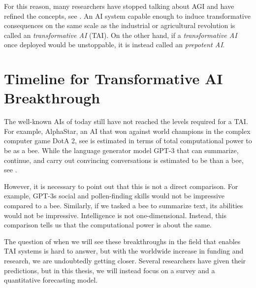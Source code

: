 \documentclass[12pt,A4]{report}
\theoremstyle{definition}
\begin{document}
For this reason, many researchers have stopped talking about AGI and have refined the concepts, see \citet{CritchKruger}. An AI system capable enough to induce transformative consequences on the same scale as the industrial or agricultural revolution is called an \textit{transformative AI} (TAI). On the other hand, if a \textit{transformative AI} once deployed would be unstoppable, it is instead called an \textit{prepotent AI}. 


\section{Timeline for Transformative AI Breakthrough}
The well-known AIs of today still have not reached the levels required for a TAI. For example, AlphaStar, an AI that won against world champions in the complex computer game DotA 2, see \citet{ALphaStar} is estimated in terms of total computational power to be  as a bee. While the language generator model GPT-3 that can summarize, continue, and carry out convincing conversations is estimated to be  than a bee, see \citet{Ajeya}.

However, it is necessary to point out that this is not a direct comparison. For example, GPT-3s social and pollen-finding skills would not be impressive compared to a bee. Similarly, if we tasked a bee to summarize text, its abilities would not be impressive. Intelligence is not one-dimensional. Instead, this comparison tells us that the computational power is about the same. 

The question of when we will see these breakthroughs in the field that enables TAI systems is hard to answer, but with the worldwide increase in funding and research, we are undoubtedly getting closer. Several researchers have given their predictions, but in this thesis, we will instead focus on a survey and a quantitative forecasting model.

\end{document}
